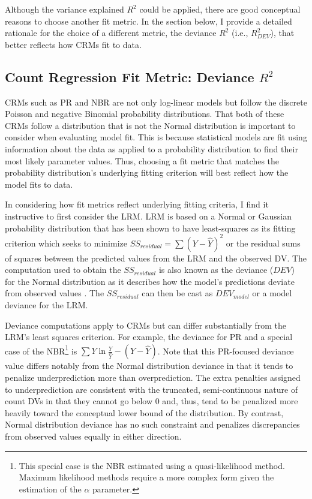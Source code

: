 \documentclass[ShortAfour,times,sageapa]{sagej}
\begin{document}
	Although the variance explained $R^2$ could be applied, there are good conceptual reasons to choose another fit metric. 
	In the section below, I provide a detailed rationale for the choice of a different metric, the deviance $R^2$ (i.e., $R^2_{DEV}$), that better reflects how CRMs fit to data. 
	
	\subsection{Count Regression Fit Metric: Deviance $R^2$}
	
	CRMs such as PR and NBR are not only log-linear models but follow the discrete Poisson and negative Binomial probability distributions.
	That both of these CRMs follow a distribution that is not the Normal distribution is important to consider when evaluating model fit.
	This is because statistical models are fit using information about the data as applied to a probability distribution to find their most likely parameter values.
	Thus, choosing a fit metric that matches the probability distribution's underlying fitting criterion will best reflect how the model fits to data.
	
	In considering how fit metrics reflect underlying fitting criteria, I find it instructive to first consider the LRM.
	LRM is based on a Normal or Gaussian probability distribution that has been shown to have least-squares as its fitting criterion which seeks to minimize $SS_{residual} = \sum (Y - \hat{Y})^2$ or the residual sums of squares between the predicted values from the LRM and the observed DV. The computation used to obtain the $SS_{residual}$ is also known as the deviance ($DEV$) for the Normal distribution as it describes how the model's predictions deviate from observed values \cite{mccullagh2019generalized}.
	The $SS_{residual}$ can then be cast as $DEV_{model}$ or a model deviance for the LRM.
	
	Deviance computations apply to CRMs but can differ substantially from the LRM's least squares criterion.
	For example, the deviance for PR and a special case of the NBR\footnote{
		This special case is the NBR estimated using a quasi-likelihood method. 
		Maximum likelihood methods require a more complex form given the estimation of the $\alpha$ parameter.} 
	is $\sum Y\ln \frac{Y}{\hat{Y}} - (Y - \hat{Y})$. 
	Note that this PR-focused deviance value differs notably from the Normal distribution deviance in that it tends to penalize underprediction more than overprediction.
	The extra penalties assigned to underprediction are consistent with the truncated, semi-continuous nature of count DVs in that they cannot go below 0 and, thus, tend to be penalized more heavily toward the conceptual lower bound of the distribution.
	By contrast, Normal distribution deviance has no such constraint and penalizes discrepancies from observed values equally in either direction.
	
\end{document}
